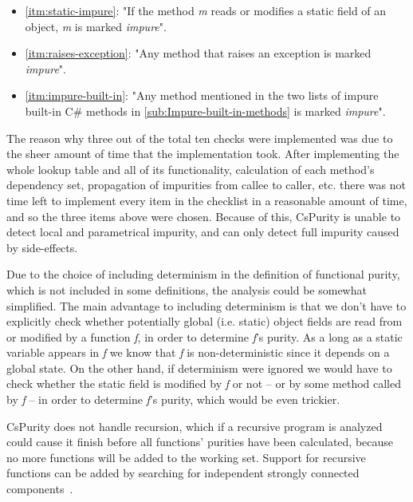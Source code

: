 \documentclass[a4paper,12pt]{article}
\begin{document}
\begin{itemize}
  \item \autoref{itm:static-impure}: "If the method \textit{m} reads or modifies a static field of an object, \textit{m} is marked \textit{impure}".
  \item \autoref{itm:raises-exception}: "Any method that raises an exception is marked \textit{impure}".
  \item \autoref{itm:impure-built-in}: "Any method mentioned in the two lists of impure built-in C\# methods in \autoref{sub:Impure-built-in-methods} is marked \textit{impure}".
\end{itemize}

The reason why three out of the total ten checks were implemented was due to the sheer amount of time that the implementation took. After implementing the whole lookup table and all of its functionality, calculation of each method's dependency set, propagation of impurities from callee to caller, etc. there was not time left to implement every item in the checklist in a reasonable amount of time, and so the three items above were chosen. Because of this, CsPurity is unable to detect local and parametrical impurity, and can only detect full impurity caused by side-effects.

Due to the choice of including determinism in the definition of functional purity, which is not included in some definitions, the analysis could be somewhat simplified. The main advantage to including determinism is that we don't have to explicitly check whether potentially global (i.e. static) object fields are read from or modified by a function \textit{f}, in order to determine \textit{f}'s purity. As a long as a static variable appears in \textit{f} we know that \textit{f} is non-deterministic since it depends on a global state. On the other hand, if determinism were ignored we would have to check whether the static field is modified by \textit{f} or not -- or by some method called by \textit{f} -- in order to determine \textit{f}'s purity, which would be even trickier.


CsPurity does not handle recursion, which if a recursive program is analyzed could cause it finish before all functions' purities have been calculated, because no more functions will be added to the working set. Support for recursive functions can be added by searching for independent strongly connected components~\cite{pitidis2010purity}.
\end{document}
